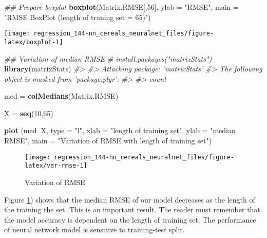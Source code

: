 \documentclass[]{book}
\newenvironment{Shaded}{\begin{snugshade}}{\end{snugshade}}
\newcommand{\CommentTok}[1]{\textcolor[rgb]{0.56,0.35,0.01}{\textit{#1}}}
\newcommand{\DataTypeTok}[1]{\textcolor[rgb]{0.13,0.29,0.53}{#1}}
\newcommand{\DecValTok}[1]{\textcolor[rgb]{0.00,0.00,0.81}{#1}}
\newcommand{\KeywordTok}[1]{\textcolor[rgb]{0.13,0.29,0.53}{\textbf{#1}}}
\newcommand{\NormalTok}[1]{#1}
\newcommand{\OperatorTok}[1]{\textcolor[rgb]{0.81,0.36,0.00}{\textbf{#1}}}
\newcommand{\StringTok}[1]{\textcolor[rgb]{0.31,0.60,0.02}{#1}}
\begin{document}
\begin{Shaded}
\begin{Highlighting}[]
\CommentTok{## Prepare boxplot}
\KeywordTok{boxplot}\NormalTok{(Matrix.RMSE[,}\DecValTok{56}\NormalTok{], }\DataTypeTok{ylab =} \StringTok{"RMSE"}\NormalTok{, }\DataTypeTok{main =} \StringTok{"RMSE BoxPlot (length of traning set = 65)"}\NormalTok{)}
\end{Highlighting}
\end{Shaded}

\begin{center}\texttt{[image: regression\_144-nn\_cereals\_neuralnet\_files/figure-latex/boxplot-1]} \end{center}



\begin{Shaded}
\begin{Highlighting}[]
\CommentTok{## Variation of median RMSE }
\CommentTok{# install.packages("matrixStats")}
\KeywordTok{library}\NormalTok{(matrixStats)}
\CommentTok{#> }
\CommentTok{#> Attaching package: 'matrixStats'}
\CommentTok{#> The following object is masked from 'package:plyr':}
\CommentTok{#> }
\CommentTok{#>     count}

\NormalTok{med =}\StringTok{ }\KeywordTok{colMedians}\NormalTok{(Matrix.RMSE)}

\NormalTok{X =}\StringTok{ }\KeywordTok{seq}\NormalTok{(}\DecValTok{10}\NormalTok{,}\DecValTok{65}\NormalTok{)}

\KeywordTok{plot}\NormalTok{ (med}\OperatorTok{~}\NormalTok{X, }\DataTypeTok{type =} \StringTok{"l"}\NormalTok{, }\DataTypeTok{xlab =} \StringTok{"length of training set"}\NormalTok{, }\DataTypeTok{ylab =} \StringTok{"median RMSE"}\NormalTok{, }\DataTypeTok{main =} \StringTok{"Variation of RMSE with length of training set"}\NormalTok{)}
\end{Highlighting}
\end{Shaded}

\begin{figure}

{\centering \texttt{[image: regression\_144-nn\_cereals\_neuralnet\_files/figure-latex/var-rmse-1]} 

}

\caption{Variation of RMSE}\label{fig:var-rmse}
\end{figure}

Figure \ref{fig:var-rmse}) shows that the median RMSE of our model decreases as the length of the training the set. This is an important result. The reader must remember that the model accuracy is dependent on the length of training set. The performance of neural network model is sensitive to training-test split.
\end{document}
